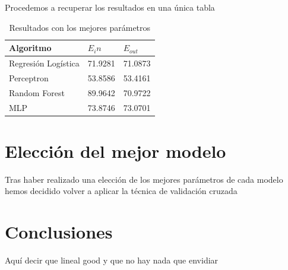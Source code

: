 \documentclass[a4paper,11pt]{article}
\begin{document}
Procedemos a recuperar los resultados en una única tabla

\begin{table}[H]
    \centering
    \begin{tabular}{|l|l|l|}
    \hline
    Algoritmo    & $E_in$  & $E_{out}$ \\ \hline
    Regresión Logística   & 71.9281 & 71.0873 \\ \hline
    Perceptron & 53.8586 & 53.4161 \\ \hline
    Random Forest   & 89.9642 & 70.9722 \\ \hline
    MLP   & 73.8746 & 73.0701 \\ \hline
    \end{tabular}
    \caption{Resultados con los mejores parámetros}
\end{table}

\section{Elección del mejor modelo}

Tras haber realizado una elección de los mejores parámetros de cada modelo hemos 
decidido volver a aplicar la técnica de validación cruzada 

\section{Conclusiones}

Aquí decir que lineal good y que no hay nada que envidiar



\end{document}
